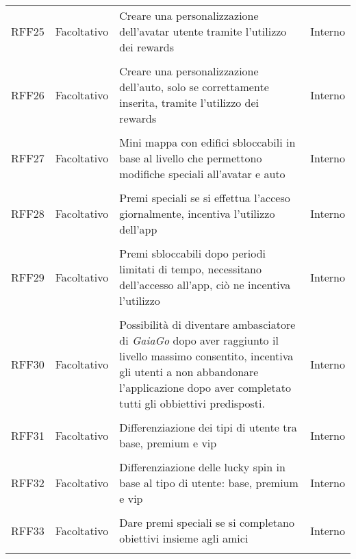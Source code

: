 \begin{longtable}{ >{\centering}p{} >{\centering}p{}
		>{\raggedright}p{} >{\centering}p{}}
	RFF25	&	Facoltativo	& Creare una personalizzazione dell'avatar utente tramite l'utilizzo dei rewards  &	Interno  \\ 	\tabularnewline
	RFF26	&	Facoltativo	& Creare una personalizzazione dell'auto, solo se correttamente inserita, tramite l'utilizzo dei rewards  &	Interno  \\ 	\tabularnewline
	RFF27	&	Facoltativo	& Mini mappa con edifici sbloccabili in base al livello che permettono modifiche speciali all'avatar e auto  &	Interno  \\ 	\tabularnewline
	RFF28	&	Facoltativo	& Premi speciali se si effettua l'acceso giornalmente, incentiva l'utilizzo dell'app  &	Interno  \\ 	\tabularnewline
	RFF29	&	Facoltativo	& Premi sbloccabili dopo periodi limitati di tempo, necessitano dell'accesso all'app, ciò ne incentiva l'utilizzo  &	Interno  \\ 	\tabularnewline
	RFF30	&	Facoltativo	& Possibilità di diventare ambasciatore di \textit{GaiaGo} dopo aver raggiunto il livello massimo consentito, incentiva gli utenti a non abbandonare l'applicazione dopo aver completato tutti gli obbiettivi predisposti.  &	Interno  \\ 	\tabularnewline
	RFF31	&	Facoltativo	& Differenziazione dei tipi di utente tra base, premium e vip  &	Interno  \\ 	\tabularnewline
	RFF32	&	Facoltativo	& Differenziazione delle lucky spin in base al tipo di utente: base, premium e vip &	Interno  \\ 	\tabularnewline
	RFF33	&	Facoltativo	& Dare premi speciali se si completano obiettivi insieme agli amici  &	Interno  \\ 	\tabularnewline
\end{longtable}

